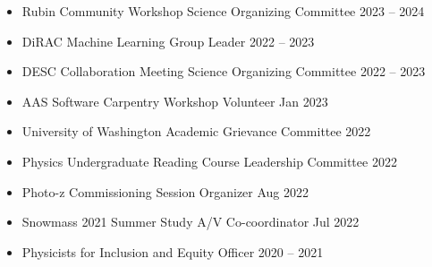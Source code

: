 \begin{itemize}
    \item Rubin Community Workshop Science Organizing Committee \hfill 2023 -- 2024

    \item DiRAC Machine Learning Group Leader \hfill 2022 -- 2023

    \item DESC Collaboration Meeting Science Organizing Committee \hfill 2022 -- 2023

    \item AAS Software Carpentry Workshop Volunteer \hfill Jan 2023

    \item University of Washington Academic Grievance Committee \hfill 2022

    \item Physics Undergraduate Reading Course Leadership Committee \hfill 2022

    \item Photo-z Commissioning Session Organizer \hfill Aug 2022

    \item Snowmass 2021 Summer Study A/V Co-coordinator \hfill Jul 2022

    \item Physicists for Inclusion and Equity Officer \hfill 2020 -- 2021
\end{itemize}